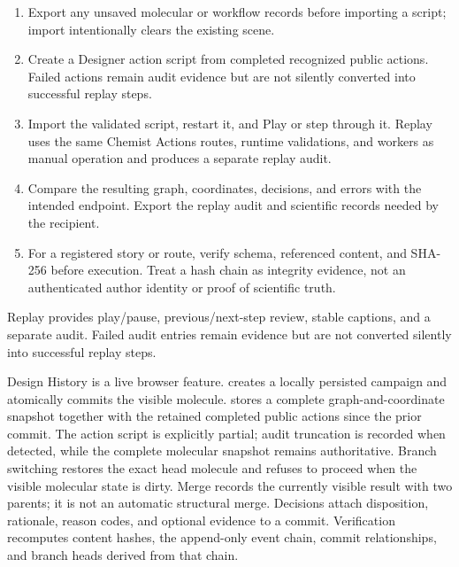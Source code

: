 \documentclass[11pt]{article}
\begin{document}
\begin{enumerate}
\item Export any unsaved molecular or workflow records before importing a script; import intentionally clears the existing scene.
\item Create a Designer action script from completed recognized public actions. Failed actions remain audit evidence but are not silently converted into successful replay steps.
\item Import the validated script, restart it, and Play or step through it. Replay uses the same Chemist Actions routes, runtime validations, and workers as manual operation and produces a separate replay audit.
\item Compare the resulting graph, coordinates, decisions, and errors with the intended endpoint. Export the replay audit and scientific records needed by the recipient.
\item For a registered story or route, verify schema, referenced content, and SHA-256 before execution. Treat a hash chain as integrity evidence, not an authenticated author identity or proof of scientific truth.
\end{enumerate}

Replay provides play/pause, previous/next-step review, stable captions, and a separate audit. Failed audit entries remain evidence but are not converted silently into successful replay steps.


Design History is a live browser feature.  creates a locally persisted campaign and atomically commits the visible molecule.  stores a complete graph-and-coordinate snapshot together with the retained completed public actions since the prior commit. The action script is explicitly partial; audit truncation is recorded when detected, while the complete molecular snapshot remains authoritative. Branch switching restores the exact head molecule and refuses to proceed when the visible molecular state is dirty. Merge records the currently visible result with two parents; it is not an automatic structural merge. Decisions attach disposition, rationale, reason codes, and optional evidence to a commit. Verification recomputes content hashes, the append-only event chain, commit relationships, and branch heads derived from that chain.
\end{document}
